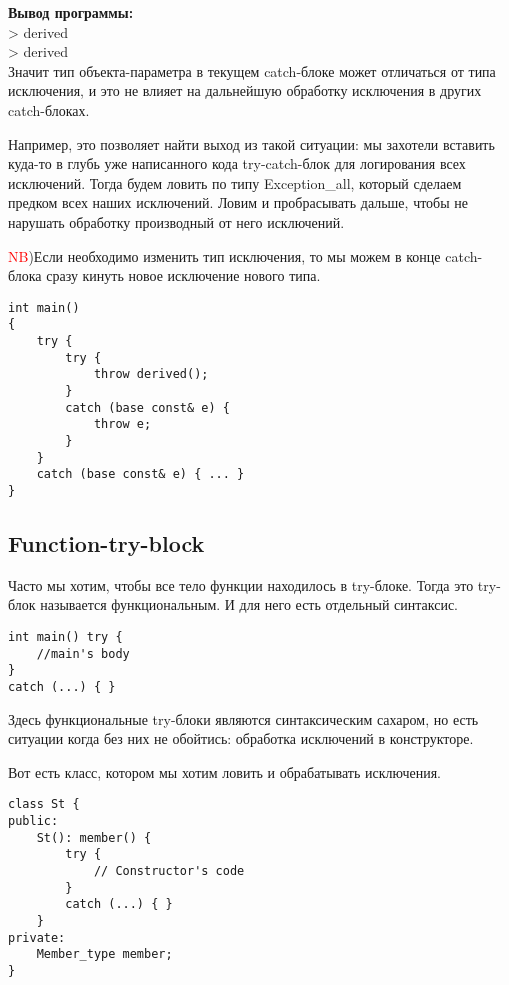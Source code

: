 \textbf{Вывод программы:} \\
> derived \\
> derived \\

Значит тип объекта-параметра в текущем catch-блоке может отличаться от типа исключения, и это не влияет на дальнейшую обработку исключения в других catch-блоках.

 Например, это позволяет найти выход из такой ситуации: мы захотели вставить куда-то в глубь уже написанного кода try-catch-блок для логирования всех исключений. Тогда будем ловить по типу Exception\_all, который сделаем предком всех наших исключений. Ловим и пробрасывать дальше, чтобы не нарушать обработку производный от него исключений.

 \textcolor{red}{NB})Если необходимо изменить тип исключения, то мы можем в конце catch-блока сразу кинуть новое исключение нового типа.

\begin{verbatim}
int main()
{
    try {
        try {
            throw derived();
        }
        catch (base const& e) {
            throw e;
        }
    }
    catch (base const& e) { ... }
}
\end{verbatim}

\subsection{Function-try-block}

Часто мы хотим, чтобы все тело функции находилось в try-блоке. Тогда это try-блок называется функциональным. И для него есть отдельный синтаксис.
\begin{verbatim}
int main() try {
    //main's body
}
catch (...) { }
\end{verbatim}

Здесь функциональные try-блоки являются синтаксическим сахаром, но есть ситуации когда без них не обойтись: обработка исключений в конструкторе.

Вот есть класс, котором мы хотим ловить и обрабатывать исключения.
\begin{verbatim}
class St {
public:
    St(): member() {
        try {
            // Constructor's code
        }
        catch (...) { }
    }
private:
    Member_type member;
}
\end{verbatim}

